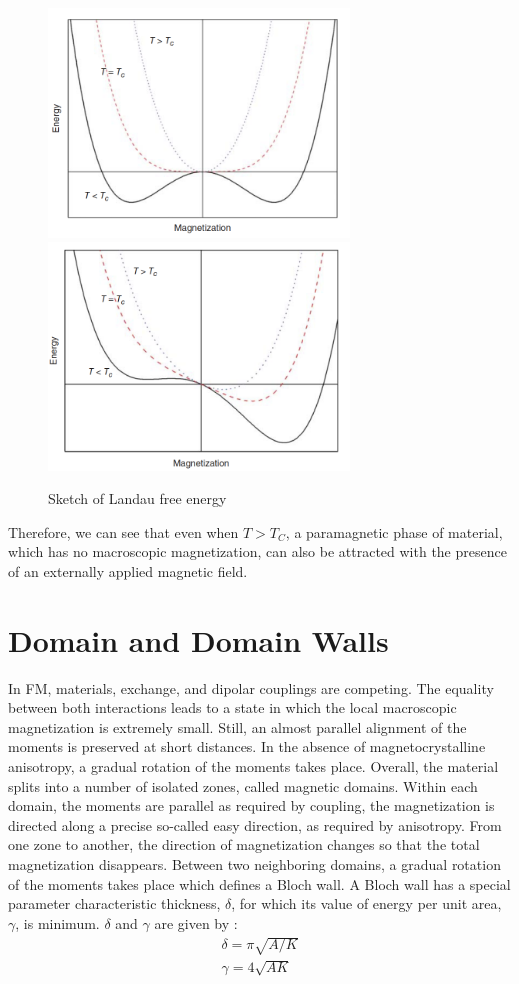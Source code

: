 \begin{figure}[H]
	\centering
	\includegraphics[width=80mm]{fig/review/landau1.png}\includegraphics[width=80mm]{fig/review/landau2.png}
	\caption[Sketch of Landau free energy.]{Sketch of Landau free energy}
\label{fig:landau}
\end{figure}

Therefore, we can see that even when $T >T_C$, a paramagnetic phase of material, which has no macroscopic magnetization, can also be attracted with the presence
of an externally applied magnetic field.

\section{Domain and Domain Walls}
In FM, materials, exchange, and dipolar couplings are competing.
The equality between both interactions leads to a state in which the local macroscopic magnetization is extremely small. Still, an almost parallel alignment of the moments is preserved at short distances.
In the absence of magnetocrystalline anisotropy, a gradual rotation of the moments takes place.
Overall, the material splits into a number of isolated zones, called magnetic domains.
Within each domain, the moments are parallel as required by coupling, the magnetization is directed along a precise so-called easy direction, as required by anisotropy. From one zone to another, the direction of magnetization changes so that the total magnetization disappears.
Between two neighboring domains, a gradual rotation of the moments takes place which defines a Bloch wall. A Bloch wall has a special parameter characteristic thickness, $\delta$, for which its value of energy per unit area, $\gamma$, is minimum. $\delta$ and $\gamma$ are given by :
\begin{align}
\delta = \pi \sqrt{A/K} \\
\gamma = 4 \sqrt{AK}
\end{align}

